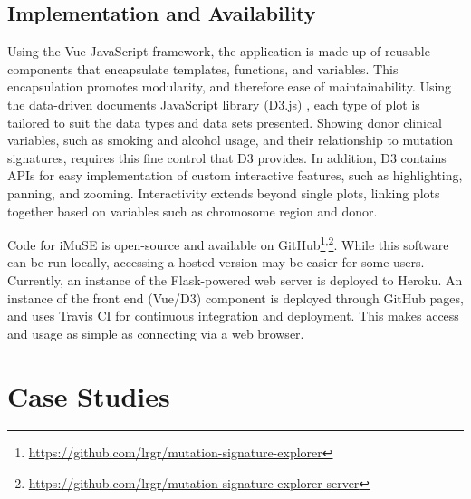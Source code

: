 \documentclass[12pt, letterpaper]{article}
\begin{document}
\subsection{Implementation and Availability}
Using the Vue JavaScript framework, the application is made up of reusable components that encapsulate templates, functions, and variables.
This encapsulation promotes modularity, and therefore ease of maintainability.
Using the data-driven documents JavaScript library (D3.js) \citep{bostock2011d3}, each type of plot is tailored to suit the data types and data sets presented.
Showing donor clinical variables, such as smoking and alcohol usage, and their relationship to mutation signatures, requires this fine control that D3 provides.
In addition, D3 contains APIs for easy implementation of custom interactive features, such as highlighting, panning, and zooming.
Interactivity extends beyond single plots, linking plots together based on variables such as chromosome region and donor.

Code for iMuSE is open-source and available on GitHub\footnote{\url{https://github.com/lrgr/mutation-signature-explorer}}\textsuperscript{,}\footnote{\url{https://github.com/lrgr/mutation-signature-explorer-server}}.
While this software can be run locally, accessing a hosted version may be easier for some users.
Currently, an instance of the Flask-powered web server is deployed to Heroku.
An instance of the front end (Vue/D3) component is deployed through GitHub pages, and uses Travis CI for continuous integration and deployment.
This makes access and usage as simple as connecting via a web browser.


\section{Case Studies}
\end{document}
